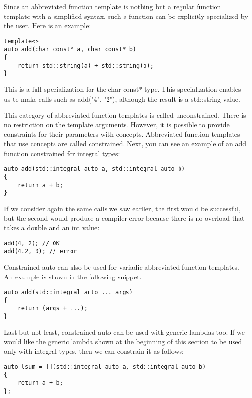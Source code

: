 Since an abbreviated function template is nothing but a regular function template with a simplified syntax, such a function can be explicitly specialized by the user. Here is an example:

\begin{lstlisting}[style=styleCXX]
template<>
auto add(char const* a, char const* b)
{
	return std::string(a) + std::string(b);
}
\end{lstlisting}

This is a full specialization for the char const* type. This specialization enables us to make calls such as add("4", "2"), although the result is a std::string value.

This category of abbreviated function templates is called unconstrained. There is no restriction on the template arguments. However, it is possible to provide constraints for their parameters with concepts. Abbreviated function templates that use concepts are called constrained. Next, you can see an example of an add function constrained for integral types:

\begin{lstlisting}[style=styleCXX]
auto add(std::integral auto a, std::integral auto b)
{
	return a + b;
}
\end{lstlisting}

If we consider again the same calls we saw earlier, the first would be successful, but the second would produce a compiler error because there is no overload that takes a double and an int value:

\begin{lstlisting}[style=styleCXX]
add(4, 2); // OK
add(4.2, 0); // error
\end{lstlisting}

Constrained auto can also be used for variadic abbreviated function templates.
An example is shown in the following snippet:

\begin{lstlisting}[style=styleCXX]
auto add(std::integral auto ... args)
{
	return (args + ...);
}
\end{lstlisting}

Last but not least, constrained auto can be used with generic lambdas too. If we would like the generic lambda shown at the beginning of this section to be used only with integral types, then we can constrain it as follows:

\begin{lstlisting}[style=styleCXX]
auto lsum = [](std::integral auto a, std::integral auto b)
{
	return a + b;
};
\end{lstlisting}

